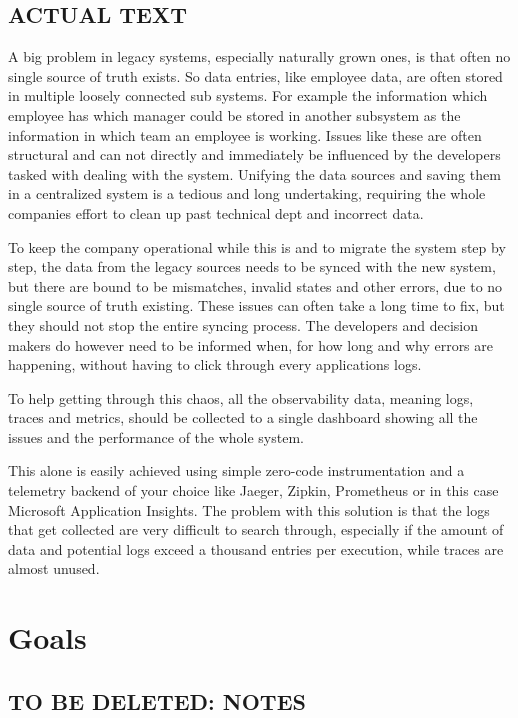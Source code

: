 \subsection{ACTUAL TEXT}

A big problem in legacy systems, especially naturally grown ones, is that often no single source of truth exists.
So data entries, like employee data, are often stored in multiple loosely connected sub systems.
For example the information which employee has which manager could be stored in another subsystem
as the information in which team an employee is working. Issues like these are often structural
and can not directly and immediately be influenced by the developers tasked with dealing with the system.
Unifying the data sources and saving them in a centralized system is a tedious and long undertaking,
requiring the whole companies effort to clean up past technical dept and incorrect data.

To keep the company operational while this is and to migrate the system step by step, 
the data from the legacy sources needs to be synced with the new system, but there are bound to be mismatches, 
invalid states and other errors, due to no single source of truth existing.
These issues can often take a long time to fix, but they should not stop the entire syncing process.
The developers and decision makers do however need to be informed when, for how long and why errors are happening,
without having to click through every applications logs.

To help getting through this chaos, all the observability data, meaning logs, traces and metrics, should be
collected to a single dashboard showing all the issues and the performance of the whole system.

This alone is easily achieved using simple zero-code instrumentation and a telemetry backend of your choice
like Jaeger, Zipkin, Prometheus or in this case Microsoft Application Insights. The problem with this solution
is that the logs that get collected are very difficult to search through, especially if the amount of data and
potential logs exceed a thousand entries per execution, while traces are almost unused.

\section{Goals}

\subsection{TO BE DELETED: NOTES}

